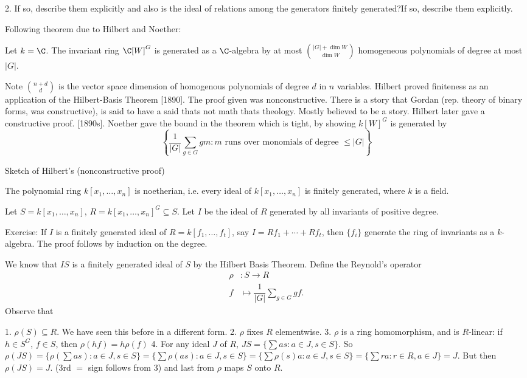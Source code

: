 2. If so, describe them explicitly and also is the ideal of relations among the generators finitely generated?If so, describe them explicitly.

Following theorem due to Hilbert and Noether:

\begin{thm}
Let $k=\C$. The invariant ring $\C[W]^G$ is generated as a $\C$-algebra by at most $\binom{|G|+\dim W}{\dim W}$ homogeneous polynomials of degree at most $|G|$. 
\end{thm}


Note $\binom{n+d}{d}$ is the vector space dimension of homogenous polynomials of degree $d$ in $n$ variables. Hilbert proved finiteness as an application of the Hilbert-Basis Theorem [1890]. The proof given was  nonconstructive. There is a story that Gordan (rep. theory of binary forms, was constructive), is said to have a said thats not math thats theology. Mostly believed to be a story. Hilbert later gave a constructive proof. [1890s]. Noether gave the bound in the theorem which is tight, by showing $k[W]^G$ is generated by
	\[
	\left\{\dfrac{1}{|G|} \sum_{g \in G } gm \colon m \text{ runs over monomials of degree } \leq |G| \right\}
	\]


Sketch of Hilbert's (nonconstructive proof)

\begin{thm}
The polynomial ring $k[x_1,\ldots,x_n]$ is noetherian, i.e. every ideal of $k[x_1,\ldots,x_n]$ is finitely generated, where $k$ is a field.
\end{thm}

Let $S=k[x_1,\ldots,x_n]$, $R=k[x_1,\ldots,x_n]^G \subseteq S$. Let $I$ be the ideal of $R$ generated by all invariants of positive degree. 

Exercise: If $I$ is a finitely generated ideal of $R=k[f_1,\ldots,f_t]$, say $I=Rf_1+\cdots+Rf_t$, then $\{f_i\}$ generate the ring of invariants as a $k$-algebra. The proof follows by induction on the degree. 


We know that $IS$ is a finitely generated ideal of $S$ by the Hilbert Basis Theorem. Define the Reynold's operator 
	\[
	\begin{split}
	\rho&: S \to R \\
	f&\mapsto \dfrac{1}{|G|} \sum_{g \in G} gf.
	\end{split}
	\]
Observe that 

1. $\rho(S) \subseteq R$. We have seen this before in a different form.
2. $\rho$ fixes $R$ elementwise. 
3. $\rho$ is a ring homomorphism, and is $R$-linear: if $h \in S^G$, $f \in S$, then $\rho(hf)=h \rho(f)$
4. For any ideal $J$ of $R$, $JS=\{ \sum as \colon a \in J, s \in S\}$. So $\rho(JS)=\{ \rho(\sum as) \colon a \in J, s \in S\}= \{ \sum \rho(as) \colon a \in J, s \in S\}= \{ \sum \rho(s)a \colon a \in J, s \in S\}= \{ \sum ra \colon r \in R, a \in J\}= J$. But then $\rho(JS)=J$. (3rd $=$ sign follows from 3) and last from $\rho$ maps $S$ onto $R$. 


